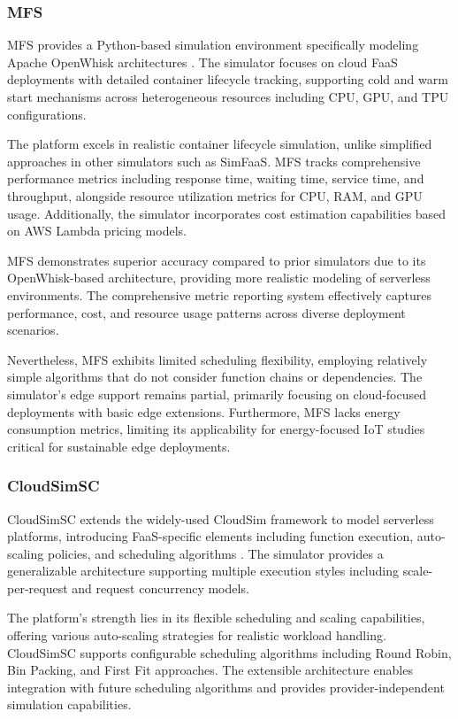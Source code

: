 \subsubsection{MFS}

MFS provides a Python-based simulation environment specifically modeling Apache OpenWhisk architectures \cite{bermbach2019mfs}. The simulator focuses on cloud FaaS deployments with detailed container lifecycle tracking, supporting cold and warm start mechanisms across heterogeneous resources including CPU, GPU, and TPU configurations.

The platform excels in realistic container lifecycle simulation, unlike simplified approaches in other simulators such as SimFaaS. MFS tracks comprehensive performance metrics including response time, waiting time, service time, and throughput, alongside resource utilization metrics for CPU, RAM, and GPU usage. Additionally, the simulator incorporates cost estimation capabilities based on AWS Lambda pricing models.

MFS demonstrates superior accuracy compared to prior simulators due to its OpenWhisk-based architecture, providing more realistic modeling of serverless environments. The comprehensive metric reporting system effectively captures performance, cost, and resource usage patterns across diverse deployment scenarios.

Nevertheless, MFS exhibits limited scheduling flexibility, employing relatively simple algorithms that do not consider function chains or dependencies. The simulator's edge support remains partial, primarily focusing on cloud-focused deployments with basic edge extensions. Furthermore, MFS lacks energy consumption metrics, limiting its applicability for energy-focused IoT studies critical for sustainable edge deployments.

\subsubsection{CloudSimSC}

CloudSimSC extends the widely-used CloudSim framework to model serverless platforms, introducing FaaS-specific elements including function execution, auto-scaling policies, and scheduling algorithms \cite{mampage2021cloudsimsc}. The simulator provides a generalizable architecture supporting multiple execution styles including scale-per-request and request concurrency models.

The platform's strength lies in its flexible scheduling and scaling capabilities, offering various auto-scaling strategies for realistic workload handling. CloudSimSC supports configurable scheduling algorithms including Round Robin, Bin Packing, and First Fit approaches. The extensible architecture enables integration with future scheduling algorithms and provides provider-independent simulation capabilities.

